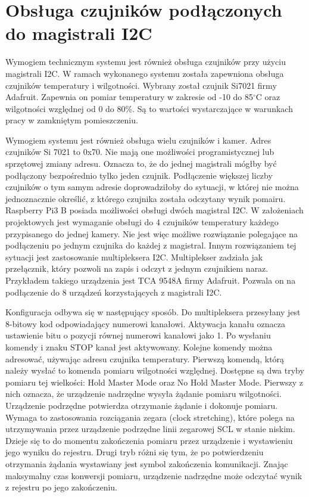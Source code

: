 \documentclass[a4paper,12pt,twoside]{report}
\begin{document}
\section{Obsługa czujników podłączonych do magistrali I2C}
Wymogiem technicznym systemu jest również obsługa czujników przy użyciu magistrali I2C. W ramach wykonanego systemu została zapewniona obsługa czujników temperatury i wilgotności. Wybrany został czujnik Si7021 firmy Adafruit. Zapewnia on pomiar temperatury w zakresie od -10 do 85$^\circ$C oraz wilgotności względnej od 0 do 80\%. Są to wartości wystarczające w warunkach pracy w zamkniętym pomieszczeniu.

Wymogiem systemu jest również obsługa wielu czujników i kamer. Adres czujników Si 7021 to 0x70. Nie mają one możliwości programistycznej lub sprzętowej zmiany adresu. Oznacza to, że do jednej magistrali mógłby być podłączony bezpośrednio tylko jeden czujnik. Podłączenie większej liczby czujników o tym samym adresie doprowadziłoby do sytuacji, w której nie można jednoznacznie określić, z którego czujnika została odczytany wynik pomairu. Raspberry Pi3 B posiada możliwości obsługi dwóch magistral I2C. W założeniach projektowych jest wymaganie obsługi do 4 czujników temperatury każdego przypisanego do jednej kamery. Nie jest więc możliwe rozwiązanie polegające na podłączeniu po jednym czujnika do każdej z magistral. Innym rozwiązaniem tej sytuacji jest zastosowanie multipleksera I2C. Multiplekser zadziała jak przełącznik, który pozwoli na zapis i odczyt z jednym czujnikiem naraz. Przykładem takiego urządzenia jest TCA 9548A firmy Adafruit. Pozwala on na podłączenie do 8 urządzeń korzystających z magistrali I2C.

Konfiguracja odbywa się w następujący sposób. Do multipleksera przesyłany jest 8-bitowy kod odpowiadający numerowi kanałowi. Aktywacja kanału oznacza ustawienie bitu o pozycji równej numerowi kanałowi jako 1. Po wysłaniu komendy i znaku STOP kanał jest aktywowany. Kolejne komendy można adresować, używając adresu czujnika temperatury. Pierwszą komendą, którą należy wysłać to komenda pomiaru wilgotności względnej. Dostępne są dwa tryby pomiaru tej wielkości: Hold Master Mode oraz No Hold Master Mode. Pierwszy z nich oznacza, że urządzenie nadrzędne wysyła żądanie pomiaru wilgotności. Urządzenie podrzędne potwierdza otrzymanie żądanie i dokonuje pomiaru. Wymaga to zastosowania rozciągania zegara (clock stretching), które polega na utrzymywania przez urządzenie podrzędne linii zegarowej SCL w stanie niskim. Dzieje się to do momentu zakończenia pomiaru przez urządzenie i wystawieniu jego wyniku do rejestru. Drugi tryb różni się tym, że po potwierdzeniu otrzymania żądania wystawiany jest symbol zakończenia komunikacji. Znając maksymalny czas konwersji pomiaru, urządzenie nadrzędne może odczytać wynik z rejestru po jego zakończeniu. 
\end{document}
